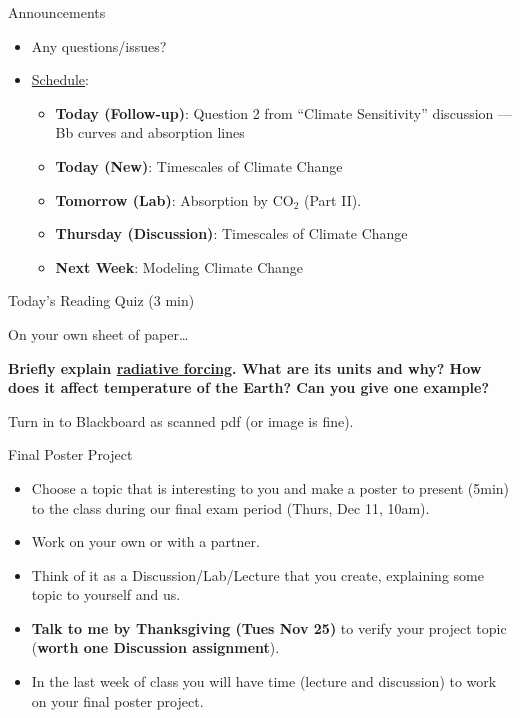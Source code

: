 \documentclass[12pt]{beamer}
\title%
{}
\subtitle
{} %
\author%
{Ben Holder}%
\date%
{}
\begin{document}

\begin{frame}{Announcements}
	\begin{itemize}
	\addtolength{\itemsep}{0.5\baselineskip}
	\item Any questions/issues?
	\item \underline{Schedule}:
		\begin{itemize}
		\item[]{\bf Today (Follow-up)}: Question 2 from ``Climate Sensitivity'' discussion --- Bb curves and absorption lines
		\item[]{\bf Today (New)}: Timescales of Climate Change
		\item[]{\bf Tomorrow (Lab)}: Absorption by $\text{CO}_2$ (Part II).
		\item[]{\bf Thursday (Discussion)}: Timescales of Climate Change
		\item[] {\bf Next Week}: Modeling Climate Change
		\end{itemize}
	\end{itemize}

\end{frame}
\begin{frame}{Today's Reading Quiz (3 min)}


	
\vspace{1cm}

On your own sheet of paper\ldots

\vspace{0.5cm}

{\bf Briefly explain \underline{radiative forcing}. What are its units and why?  How does it affect temperature of the Earth? Can you give one example?}
\vspace{0.5cm}

Turn in to Blackboard as scanned pdf (or image is fine).

\end{frame}
\begin{frame}{Final Poster Project}

\begin{itemize}
\item Choose a topic that is interesting to you and make a poster to present (5min) to the class during our final exam period (Thurs, Dec 11, 10am).
\item Work on your own or with a partner.
\item Think of it as a Discussion/Lab/Lecture that you create, explaining some topic to yourself and us.
\item {\bf Talk to me by Thanksgiving (Tues Nov 25)} to verify your project topic ({\bf worth one Discussion assignment}).
\item In the last week of class you will have time (lecture and discussion) to work on your final poster project. 
	
\end{itemize}

\end{frame}
\end{document}
